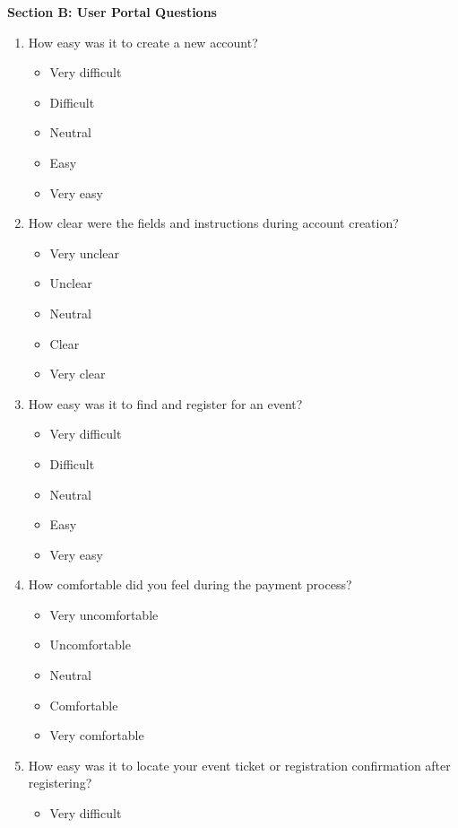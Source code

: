 \documentclass[12pt]{article}
\begin{document}
\textbf{Section B: User Portal Questions}
\begin{enumerate}
    \item How easy was it to create a new account?
    \begin{itemize}[label=$\circ$]
        \item Very difficult
        \item Difficult
        \item Neutral
        \item Easy
        \item Very easy
    \end{itemize}
    \item How clear were the fields and instructions during account creation?
    \begin{itemize}[label=$\circ$]
        \item Very unclear
        \item Unclear
        \item Neutral
        \item Clear
        \item Very clear
    \end{itemize}
    \item How easy was it to find and register for an event?
    \begin{itemize}[label=$\circ$]
        \item Very difficult
        \item Difficult
        \item Neutral
        \item Easy
        \item Very easy
    \end{itemize}
    \item How comfortable did you feel during the payment process?
    \begin{itemize}[label=$\circ$]
        \item Very uncomfortable
        \item Uncomfortable
        \item Neutral
        \item Comfortable
        \item Very comfortable
    \end{itemize}
    \item How easy was it to locate your event ticket or registration confirmation after registering?
    \begin{itemize}[label=$\circ$]
        \item Very difficult

\end{itemize}
\end{enumerate}
\end{document}
